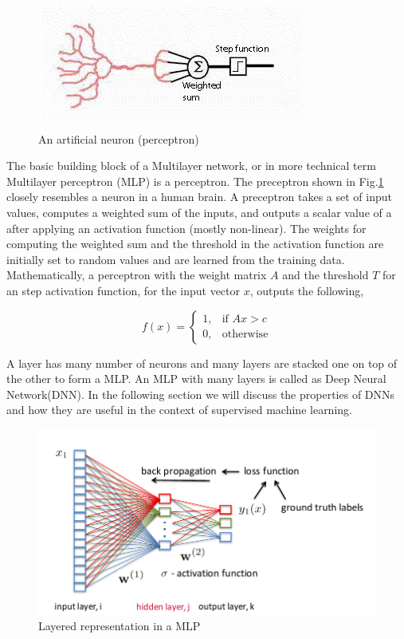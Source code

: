 \documentclass[a4paper]{article}
\begin{document}
\begin{figure}
  \includegraphics[width=.99\linewidth]{img/artificial.jpg}
  \caption{ An artificial neuron (perceptron)}
  \label{fig:ann}
\end{figure}


The basic  building block of a Multilayer  network,  or in  more  technical term
Multilayer  perceptron   (MLP)  is   a   perceptron.  The  preceptron  shown  in
Fig.\ref{fig:ann} closely  resembles  a  neuron in  a  human brain. A preceptron
takes a set of input values, computes a weighted sum of the  inputs, and outputs
a  scalar value  of a after applying an activation function (mostly non-linear).
The  weights for computing the weighted sum and the  threshold in the activation
function are initially  set to  random values  and are learned from the training
data. Mathematically, a  perceptron with the weight matrix $A$ and the threshold
$T$ for an  step activation  function, for  the  input vector  $x$,  outputs the
following,


\[
  f(x)=
  \begin{cases}
    1, & \text{if }  A x > c \\
    0, & \text{otherwise}
  \end{cases}
\]


A layer has many number of neurons and many layers are stacked one on top of the
other  to  form  a MLP.  An  MLP  with  many  layers  is  called as Deep  Neural
Network(DNN). In the following section  we  will discuss the properties of  DNNs
and how they are useful in the context of supervised machine learning.


\begin{figure}
  \includegraphics[width=.99\linewidth]{img/mlp.png}
  \caption{Layered representation in a MLP}
  \label{fig:mlp}
\end{figure}
\end{document}
